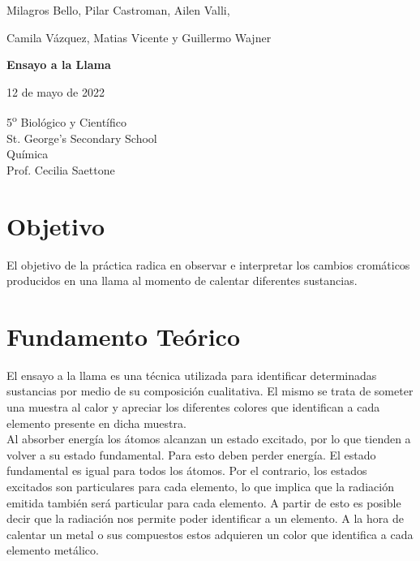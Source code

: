 \documentclass{article}
\begin{document}
\begin{titlepage}
    \begin{center}
        \large    
        
        Milagros Bello, Pilar Castroman, Ailen Valli,
        
        Camila Vázquez, Matias Vicente y Guillermo Wajner
        
        \vspace{6cm}
        \Huge
        \textbf{Ensayo a la Llama}

        \vspace{0.5cm}

        \Large
        12 de mayo de 2022

        \vspace{6cm}
        
        \normalsize
        5\textsuperscript{o} Biológico y Científico\\
        St. George’s Secondary School\\
        Química\\
        Prof. Cecilia Saettone
        \vspace{0.5cm}      
    \end{center}
\end{titlepage}

\section{Objetivo}

El objetivo de la práctica radica en observar e interpretar los cambios cromáticos producidos en una llama al momento de calentar diferentes sustancias.  

\section{Fundamento Teórico}

El ensayo a la llama es una técnica utilizada para identificar determinadas sustancias por medio de su composición cualitativa. El mismo se trata de someter una muestra al calor y apreciar los diferentes colores que identifican a cada elemento presente en dicha muestra.\\

Al absorber energía los átomos alcanzan un estado excitado, por lo que tienden a volver a su estado fundamental. Para esto deben perder energía. El estado fundamental es igual para todos los átomos. Por el contrario, los estados excitados son particulares para cada elemento, lo que implica que la radiación emitida también será particular para cada elemento. A partir de esto es posible decir que la radiación nos permite poder identificar a un elemento. A la hora de calentar un metal o sus compuestos estos adquieren un color que identifica a cada elemento metálico.\\
\end{document}

